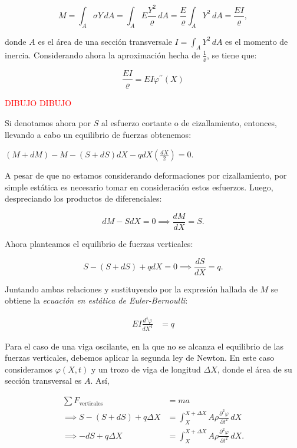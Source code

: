 \[M = \int_A \sigma Y \, dA = \int_A E \frac{Y^2}{\varrho} \, dA = \frac{E}{\varrho} \int_A Y^2 \, dA = \frac{E I}{\varrho},\]

donde $A$ es el área de una sección transversal\footnotemark e $I = \int_A Y^2 \, dA$ es el momento de inercia. Considerando ahora la aproximación hecha de $\frac{1}{\varrho}$, se tiene que:

\[\frac{E I}{\varrho} = EI \varphi^{\prime \prime}(X)\]

\textcolor{red}{DIBUJO}
\textcolor{red}{DIBUJO}

Si denotamos ahora por $S$ al esfuerzo cortante o de cizallamiento, entonces, llevando a cabo un equilibrio de fuerzas obtenemos:

$(M + dM) - M - (S + dS)dX - q dX (\frac{dX}{2}) = 0.$

A pesar de que no estamos considerando deformaciones por cizallamiento, por simple estática es necesario tomar en consideración estos esfuerzos. Luego, despreciando los productos de diferenciales:

\[dM - SdX = 0 \implies \frac{dM}{dX} = S.\]

Ahora planteamos el equilibrio de fuerzas verticales:

\[S - (S + dS) + q dX = 0 \implies \frac{dS}{dX} = q.\]

Juntando ambas relaciones y sustituyendo por la expresión hallada de $M$ se obtiene la \textit{ecuación en estática de Euler-Bernoulli}:

\begin{align*}
    \label{eq::eulerbernoulliestatica}
    EI \frac{d^4\varphi}{dX^4} &= q
\end{align*}

Para el caso de una viga oscilante, en la que no se alcanza el equilibrio de las fuerzas verticales, debemos aplicar la segunda ley de Newton. En este caso consideramos $\varphi(X,t)$ y un trozo de viga de longitud $\Delta X$, donde el área de su sección transversal es $A$. Así,

\begin{align*}
    \sum F_{\text{verticales}} &= m a\\
    \implies S - (S + dS) + q\Delta X &= \int_{X}^{X + \Delta X} A \rho \frac{\partial^2 \varphi}{\partial t^2} \, dX\\
    \implies -dS + q\Delta X &= \int_{X}^{X + \Delta X} A \rho \frac{\partial^2 \varphi}{\partial t^2} \, dX.
\end{align*}

